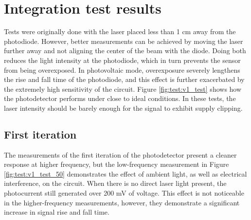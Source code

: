 \section{Integration test results}\label{chap:test:integ_res}
Tests were originally done with the laser placed less than 1 \unit{cm} away from the photodiode. However, better measurements can be achieved by moving the laser further away and not aligning the center of the beam with the diode. Doing both reduces the light intensity at the photodiode, which in turn prevents the sensor from being overexposed. In photovoltaic mode, overexposure severely lengthens the rise and fall time of the photodiode, and this effect is further exacerbated by the extremely high sensitivity of the circuit. Figure \ref{fig:test:v1_test} shows how the photodetector performs under close to ideal conditions. In these tests, the laser intensity should be barely enough for the signal to exhibit supply clipping. 

\subsection{First iteration}
The measurements of the first iteration of the photodetector present a cleaner response at higher frequency, but the low-frequency measurement in Figure \ref{fig:test:v1_test_50} demonstrates the effect of ambient light, as well as electrical interference, on the circuit. When there is no direct laser light present, the photocurrent still generated over 200 \unit{\milli\volt} of voltage. This effect is not noticeable in the higher-frequency measurements, however, they demonstrate a significant increase in signal rise and fall time.

